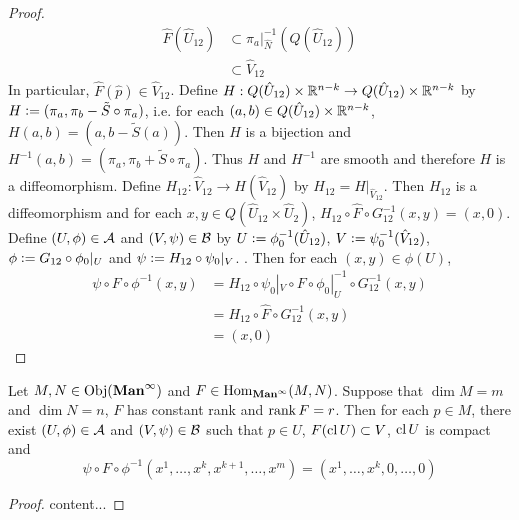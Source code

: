 \documentclass{book}
\begin{document}
\begin{proof}
	 	\begin{align*}
	 		\hat{F} (\hat{U}_{12}) 
	 		& \subset \pi_a|_{\hat{N}}^{-1}(Q(\hat{U}_{12})) \\
	 		& \subset \hat{V}_{12}
	 	\end{align*}
	 	In particular, $\hat{F}(\hat{p}) \in \hat{V}_{12}$. Define $H: Q(\hat{U}_{12}) \times \mathbb{R}^{n-k} \rightarrow Q(\hat{U}_{12}) \times \mathbb{R}^{n-k}$ by $H \vcentcolon= (\pi_a, \pi_b - \tilde{S} \circ \pi_a)$, i.e. for each $(a,b) \in Q(\hat{U}_{12}) \times \mathbb{R}^{n-k}$, $H(a,b) = (a, b-\tilde{S}(a))$. Then $H$ is a bijection and $H^{-1}(a,b) = (\pi_a, \pi_b + \tilde{S} \circ \pi_a)$. Thus $H$ and $H^{-1}$ are smooth and therefore $H$ is a diffeomorphism. Define $H_{12}: \hat{V}_{12} \rightarrow H(\hat{V}_{12})$ by 
	 	$H_{12} = H|_{\hat{V}_{12}}$. Then $H_{12}$ is a diffeomorphism and for each $x,y \in Q(\hat{U}_{12} \times \hat{U}_{2})$, $H_{12} \circ \hat{F} \circ G_{12}^{-1}(x, y) = (x, 0)$. Define $(U, \phi) \in \mathcal{A}$ and $(V, \psi) \in \mathcal{B}$ by $U \vcentcolon= \phi_0^{-1}(\hat{U}_{12})$, $V \vcentcolon= \psi_0^{-1}(\hat{V}_{12})$, $\phi \vcentcolon= G_{12} \circ \phi_0|_{U}$ and $\psi \vcentcolon= H_{12} \circ \psi_0|_V$. . Then for each $(x,y) \in \phi(U)$,
	 	\begin{align*}
	 		\psi \circ F \circ \phi^{-1}(x, y)
	 		& = H_{12} \circ \psi_0|_V \circ F \circ \phi_0|_U^{-1} \circ G_{12}^{-1} (x,y) \\
	 		& = H_{12} \circ \hat{F} \circ G_{12}^{-1}(x,y) \\
	 		& = (x, 0)
	 	\end{align*}
	\end{proof}

	\begin{ex}
		Let $M, N \in \operatorname{Obj}(\operatorname*{\text{\textbf{Man}}^{\infty}})$ and $F \in \operatorname{Hom}_{\operatorname*{\text{\textbf{Man}}^{\infty}}}(M, N)$. Suppose that $\dim M = m$ and $\dim N = n$, $F$ has constant rank and $\operatorname{\text{rank}} F = r$. Then for each $p \in M$, there exist $(U, \phi) \in \mathcal{A}$ and $(V, \psi) \in \mathcal{B}$ such that $p \in U$, $F(\operatorname{cl} U) \subset V$, $\operatorname{cl} U$ is compact and 
		$$\psi \circ F \circ \phi^{-1}(x^1, \ldots, x^k, x^{k+1}, \ldots, x^m) = (x^1, \ldots, x^k, 0, \ldots, 0)$$ 
	\end{ex}

	\begin{proof}
		content... 
	\end{proof}
\end{document}
